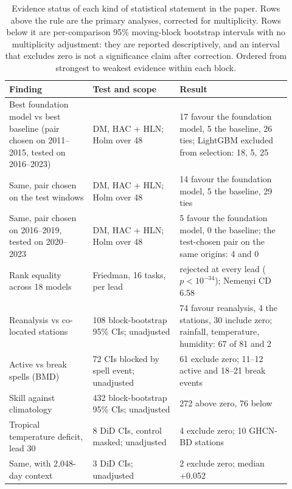 \begin{table}[htbp]
  \centering
  \footnotesize
  \caption{Evidence status of each kind of statistical statement in the paper. Rows above the rule are the primary analyses, corrected for multiplicity. Rows below it are per-comparison 95\% moving-block bootstrap intervals with no multiplicity adjustment: they are reported descriptively, and an interval that excludes zero is not a significance claim after correction. Ordered from strongest to weakest evidence within each block.}
  \label{tab:evidence}
  \begin{tabular}{p{0.27\linewidth}p{0.29\linewidth}p{0.36\linewidth}}
    \toprule
    Finding & Test and scope & Result \\
    \midrule
    Best foundation model vs best baseline (pair chosen on 2011--2015, tested on 2016--2023) & DM, HAC + HLN; Holm over 48 & 17 favour the foundation model, 5 the baseline, 26 ties; LightGBM excluded from selection: 18, 5, 25 \\
    Same, pair chosen on the test windows & DM, HAC + HLN; Holm over 48 & 14 favour the foundation model, 5 the baseline, 29 ties \\
    Same, pair chosen on 2016--2019, tested on 2020--2023 & DM, HAC + HLN; Holm over 48 & 5 favour the foundation model, 0 the baseline; the test-chosen pair on the same origins: 4 and 0 \\
    Rank equality across 18 models & Friedman, 16 tasks, per lead & rejected at every lead ($p < 10^{-34}$); Nemenyi CD 6.58 \\
    \midrule
    Reanalysis vs co-located stations & 108 block-bootstrap 95\% CIs; unadjusted & 74 favour reanalysis, 4 the stations, 30 include zero; rainfall, temperature, humidity: 67 of 81 and 2 \\
    Active vs break spells (BMD) & 72 CIs blocked by spell event; unadjusted & 61 exclude zero; 11--12 active and 18--21 break events \\
    Skill against climatology & 432 block-bootstrap 95\% CIs; unadjusted & 272 above zero, 76 below \\
    Tropical temperature deficit, lead 30 & 8 DiD CIs, control masked; unadjusted & 4 exclude zero; 10 GHCN-BD stations \\
    Same, with 2{,}048-day context & 3 DiD CIs; unadjusted & 2 exclude zero; median +0.052 \\
    \bottomrule
  \end{tabular}
\end{table}
